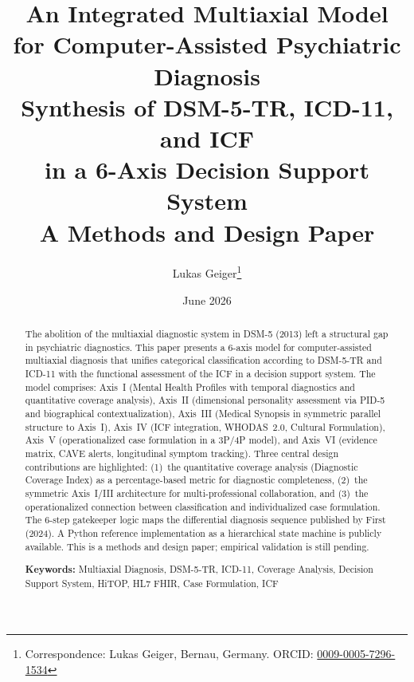 \documentclass[11pt,a4paper]{article}
\begin{document}
\title{\textbf{\huge An Integrated Multiaxial Model\\for Computer-Assisted Psychiatric Diagnosis}\\[0.5em]
\Large Synthesis of DSM-5-TR, ICD-11, and ICF\\in a 6-Axis Decision Support System\\[0.3em]
\large A Methods and Design Paper}

\author[1]{Lukas Geiger\thanks{Correspondence: Lukas Geiger, Bernau, Germany. ORCID: \href{https://orcid.org/0009-0005-7296-1534}{0009-0005-7296-1534}}}

\date{June 2026}

\maketitle

\begin{abstract}
\noindent The abolition of the multiaxial diagnostic system in DSM-5 (2013) left a structural gap in psychiatric diagnostics. This paper presents a 6-axis model for computer-assisted multiaxial diagnosis that unifies categorical classification according to DSM-5-TR and ICD-11 with the functional assessment of the ICF in a decision support system. The model comprises: Axis~I (Mental Health Profiles with temporal diagnostics and quantitative coverage analysis), Axis~II (dimensional personality assessment via PID-5 and biographical contextualization), Axis~III (Medical Synopsis in symmetric parallel structure to Axis~I), Axis~IV (ICF integration, WHODAS~2.0, Cultural Formulation), Axis~V (operationalized case formulation in a 3P/4P model), and Axis~VI (evidence matrix, CAVE alerts, longitudinal symptom tracking). Three central design contributions are highlighted: (1)~the quantitative coverage analysis (Diagnostic Coverage Index) as a percentage-based metric for diagnostic completeness, (2)~the symmetric Axis~I/III architecture for multi-professional collaboration, and (3)~the operationalized connection between classification and individualized case formulation. The 6-step gatekeeper logic maps the differential diagnosis sequence published by First (2024). A Python reference implementation as a hierarchical state machine is publicly available. This is a methods and design paper; empirical validation is still pending.

\vspace{0.5em}
\noindent \textbf{Keywords:} Multiaxial Diagnosis, DSM-5-TR, ICD-11, Coverage Analysis, Decision Support System, HiTOP, HL7 FHIR, Case Formulation, ICF
\end{abstract}
\end{document}
